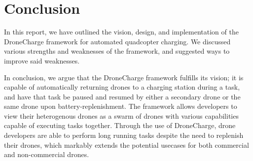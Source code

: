 \section{Conclusion}
In this report, we have outlined the vision, design, and implementation of the DroneCharge framework for automated quadcopter charging. We discussed various strengths and weaknesses of the framework, and suggested ways to improve said weaknesses.

In conclusion, we argue that the DroneCharge framework fulfills its vision; it is capable of automatically returning drones to a charging station during a task, and have that task be paused and resumed by either a secondary drone or the same drone upon battery-replenishment. The framework allows developers to view their heterogenous drones as a swarm of drones with various capabilities capable of executing tasks together. Through the use of DroneCharge, drone developers are able to perform long running tasks despite the need to replenish their drones, which markably extends the potential usecases for both commercial and non-commercial drones.
